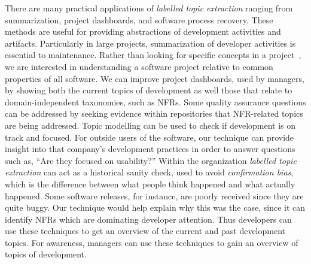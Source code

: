 \documentclass[]{sig-alternate}
\begin{document}
There are many practical applications of \emph{labelled topic
  extraction} 
ranging from summarization, project dashboards, and software process recovery.
These methods are useful for providing abstractions of development activities and artifacts.
Particularly in large projects, summarization of developer activities is essential to maintenance. 
Rather than looking for specific concepts in a project~\cite{marcus04wcre}, we are interested in understanding a software project relative to common properties of all software.
We can improve project dashboards, used by managers, by showing both the current topics of development as well those that relate to domain-independent taxonomies, such as NFRs.
Some quality assurance questions can be addressed by seeking evidence within repositories that NFR-related topics are being addressed.
Topic modelling can be used to check if development is on track and focused.
For outside users of the software, our technique can provide insight into that company's development practices in order to answer questions such as, ``Are they focused on usability?''
Within the organization \emph{labelled topic extraction} can act as a historical sanity check, used to avoid \emph{confirmation bias}, which is the difference between what people think happened and what actually happened. 
Some software releases, for instance, are poorly received since they are quite buggy. 
Our technique would help explain why this was the case, since it can identify NFRs which are dominating developer attention.
Thus developers can use these techniques to get an overview of the current and past development topics.
For awareness, managers can use these techniques to gain an overview of topics of development.



\end{document}
